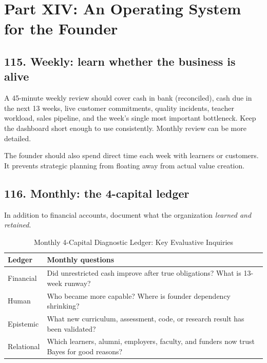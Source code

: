 
\section*{Part XIV: An Operating System for the Founder}

\subsection{115. Weekly: learn whether the business is alive}

A 45-minute weekly review should cover cash in bank (reconciled), cash due in the next 13 weeks, live customer commitments, quality incidents, teacher workload, sales pipeline, and the week's single most important bottleneck. Keep the dashboard short enough to use consistently. Monthly review can be more detailed.

The founder should also spend direct time each week with learners or customers. It prevents strategic planning from floating away from actual value creation.

\subsection{116. Monthly: the 4-capital ledger}

In addition to financial accounts, document what the organization \textit{learned and retained}.

\begin{table}[t]
\centering
\small
\caption{Monthly 4-Capital Diagnostic Ledger: Key Evaluative Inquiries}
\label{tab:ch36_four_capital_ledger}
\begin{tabularx}{\textwidth}{p{2.5cm} X}
\toprule
\textbf{ Ledger } & \textbf{ Monthly questions } \\
\midrule
 Financial  &  Did unrestricted cash improve after true obligations? What is 13-week runway?  \\
 Human  &  Who became more capable? Where is founder dependency shrinking?  \\
 Epistemic  &  What new curriculum, assessment, code, or research result has been validated?  \\
 Relational  &  Which learners, alumni, employers, faculty, and funders now trust Bayes for good reasons?  \\
\bottomrule
\end{tabularx}
\end{table}

